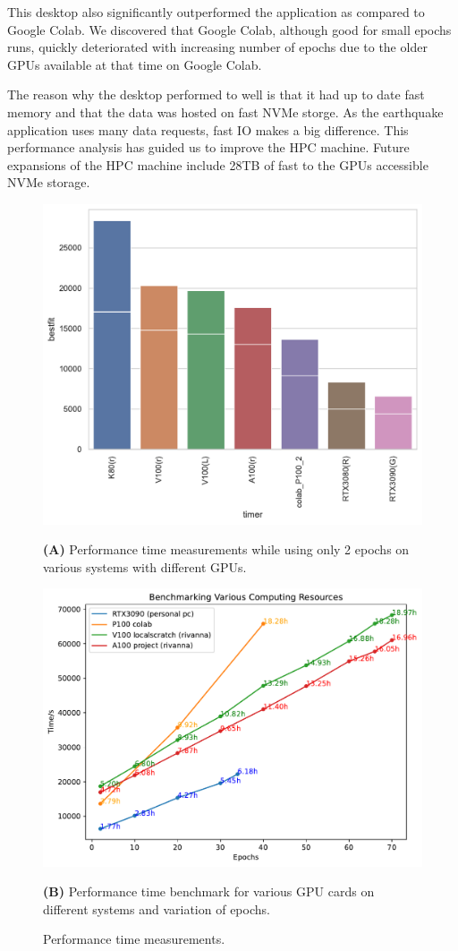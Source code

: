 \documentclass[utf8]{FrontiersinVancouver} %
\begin{document}
This desktop also significantly outperformed the application as compared 
to Google Colab. We discovered that Google Colab, although good for small 
epochs runs, quickly deteriorated with increasing number of epochs due to 
the older GPUs available at that time on Google Colab.

The reason why the desktop performed to well is that it had up to date
fast memory and that the data was hosted on fast NVMe storge. As the
earthquake application uses many data requests, fast IO makes a big
difference. This performance analysis has guided us to improve the HPC
machine. Future expansions of the HPC machine include 28TB of fast
to the GPUs accessible NVMe storage.

\begin{figure}[p]

  \centering\includegraphics[width=0.75\columnwidth]{images/Graphics_Cards_BestFit_bar.pdf}

  {\bf (A)} Performance time measurements while using only 2 epochs on
  various systems with different GPUs.

  \centering\includegraphics[width=0.75\columnwidth]{images/Benchmark_comp_resource.pdf}

  {\bf (B)} Performance time benchmark for various GPU cards on
  different systems and variation of epochs.
    
  \caption{Performance time measurements.}
  \label{fig:performance-projection}
\end{figure}
\end{document}

